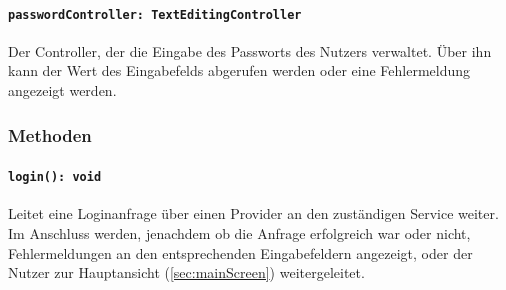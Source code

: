 \documentclass{entwurfsheft}
\begin{document}
\paragraph{\texttt{passwordController: TextEditingController}}
Der Controller, der die Eingabe des Passworts des Nutzers verwaltet. Über ihn kann der Wert des Eingabefelds abgerufen werden oder eine Fehlermeldung angezeigt werden.
\subsubsection*{Methoden}
\paragraph{\texttt{login(): void}}
Leitet eine Loginanfrage über einen Provider an den zuständigen Service weiter. Im Anschluss werden, jenachdem ob die Anfrage erfolgreich war oder nicht, Fehlermeldungen an den entsprechenden Eingabefeldern angezeigt, oder der Nutzer zur Hauptansicht (\ref{sec:mainScreen}) weitergeleitet.

\newpage
\end{document}
